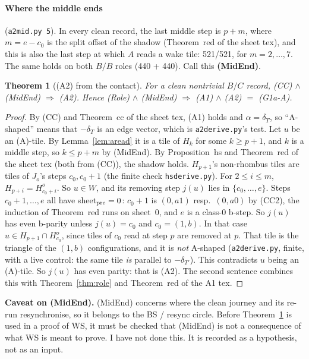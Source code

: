 \documentclass[11pt]{article}
\newtheorem{theorem}{Theorem}\newtheorem{lemma}[theorem]{Lemma}\newtheorem{proposition}[theorem]{Proposition}
\theoremstyle{definition}\newtheorem{definition}[theorem]{Definition}\newtheorem{remark}[theorem]{Remark}
\begin{document}
\paragraph{Where the middle ends} (\texttt{a2mid.py 5}). In every clean record, the last middle step is $p+m$, where $m=e-c_0$ is the split offset of the shadow (Theorem~red of the sheet tex), and this is also the last step at which $A$ reads a wake tile: 521/521, for $m=2,\dots,7$. The same holds on both $B/B$ roles (440 + 440). Call this \textbf{(MidEnd)}.
\begin{theorem}[(A2) from the contact]\label{thm:a2}
For a clean nontrivial $B/C$ record, (CC) $\wedge$ (MidEnd) $\Rightarrow$ (A2). Hence (Role) $\wedge$ (MidEnd) $\Rightarrow$ (A1) $\wedge$ (A2) $=$ (G1a-A).
\end{theorem}
\begin{proof}
By (CC) and Theorem~cc of the sheet tex, (A1) holds and $\alpha=\delta_T$, so ``A-shaped'' means that $-\delta_T$ is an edge vector, which is \texttt{a2derive.py}'s test. Let $u$ be an (A)-tile. By Lemma~\ref{lem:aread} it is a tile of $H_k$ for some $k\ge p+1$, and $k$ is a middle step, so $k\le p+m$ by (MidEnd). By Proposition~hs and Theorem~red of the sheet tex (both from (CC)), the shadow holds. $H_{p+1}$'s non-rhombus tiles are tiles of $J_o$'s steps $c_0,c_0+1$ (the finite check \texttt{hsderive.py}). For $2\le i\le m$, $H_{p+i}=H^o_{c_0+i}$. So $u\in W$, and its removing step $j(u)$ lies in $\{c_0,\dots,e\}$.
Steps $c_0+1,\dots,e$ all have sheet$_{\rm pre}=0$: $c_0+1$ is $(0,a1)$ resp.\ $(0,a0)$ by (CC2), the induction of Theorem~red runs on sheet~$0$, and $e$ is a class-0 b-step. So $j(u)$ has even b-parity unless $j(u)=c_0$ and $c_0=(1,b)$.
In that case $u\in H_{p+1}\cap H^o_{c_0}$, since tiles of $c_0$ read at step $p$ are removed at $p$. That tile is the triangle of the $(1,b)$ configurations, and it is \emph{not} A-shaped (\texttt{a2derive.py}, finite, with a live control: the same tile \emph{is} parallel to $-\delta_{T'}$). This contradicts $u$ being an (A)-tile. So $j(u)$ has even parity: that is (A2). The second sentence combines this with Theorem~\ref{thm:role} and Theorem~red of the A1 tex.
\end{proof}
\noindent\textbf{Caveat on (MidEnd).} (MidEnd) concerns where the clean journey and its re-run resynchronise, so it belongs to the BS / resync circle. Before Theorem~\ref{thm:a2} is used in a proof of WS, it must be checked that (MidEnd) is not a consequence of what WS is meant to prove. I have not done this. It is recorded as a hypothesis, not as an input.
\end{document}
